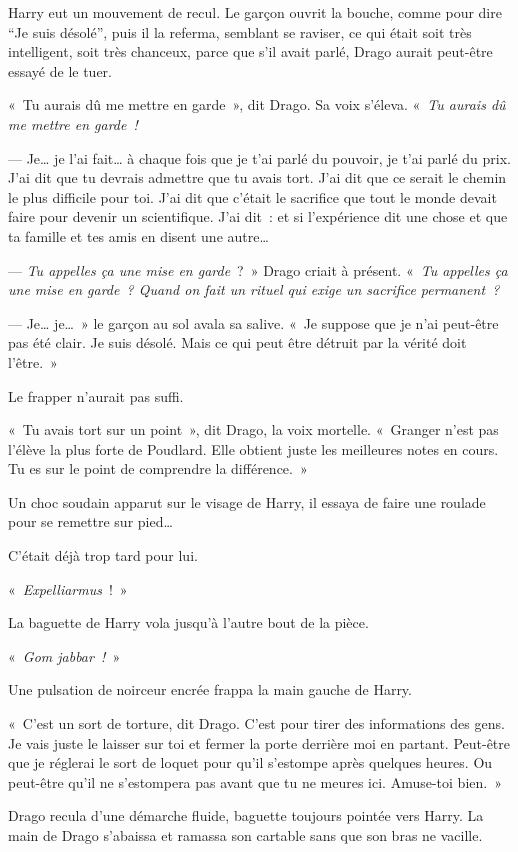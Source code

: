 Harry eut un mouvement de recul.
Le garçon ouvrit la bouche, comme pour dire “Je suis désolé”, puis il la referma, semblant se raviser, ce qui était soit très intelligent, soit très chanceux, parce que s'il avait parlé, Drago aurait peut-être essayé de le tuer.

«~Tu aurais dû me mettre en garde~», dit Drago.
Sa voix s'éleva.
«~\emph{Tu aurais dû me mettre en garde~!}

--- Je… je l'ai fait… à chaque fois que je t'ai parlé du pouvoir, je t'ai parlé du prix.
J'ai dit que tu devrais admettre que tu avais tort.
J'ai dit que ce serait le chemin le plus difficile pour toi.
J'ai dit que c'était le sacrifice que tout le monde devait faire pour devenir un scientifique.
J'ai dit~: et si l'expérience dit une chose et que ta famille et tes amis en disent une autre…

--- \emph{Tu appelles ça une mise en garde}~?~»
Drago criait à présent.
«~\emph{Tu appelles ça une mise en garde~?
Quand on fait un rituel qui exige un sacrifice permanent~?}

--- Je… je…~»
le garçon au sol avala sa salive.
«~Je suppose que je n'ai peut-être pas été clair.
Je suis désolé.
Mais ce qui peut être détruit par la vérité doit l'être.~»

Le frapper n'aurait pas suffi.

«~Tu avais tort sur un point~», dit Drago, la voix mortelle.
«~Granger n'est pas l'élève la plus forte de Poudlard.
Elle obtient juste les meilleures notes en cours.
Tu es sur le point de comprendre la différence.~»

Un choc soudain apparut sur le visage de Harry, il essaya de faire une roulade pour se remettre sur pied…

C'était déjà trop tard pour lui.

«~\emph{Expelliarmus}~!~»

La baguette de Harry vola jusqu'à l'autre bout de la pièce.

«~\emph{Gom jabbar~!}~»

Une pulsation de noirceur encrée frappa la main gauche de Harry.

«~C'est un sort de torture, dit Drago.
C'est pour tirer des informations des gens.
Je vais juste le laisser sur toi et fermer la porte derrière moi en partant.
Peut-être que je réglerai le sort de loquet pour qu'il s'estompe après quelques heures.
Ou peut-être qu'il ne s'estompera pas avant que tu ne meures ici.
Amuse-toi bien.~»

Drago recula d'une démarche fluide, baguette toujours pointée vers Harry.
La main de Drago s'abaissa et ramassa son cartable sans que son bras ne vacille.


